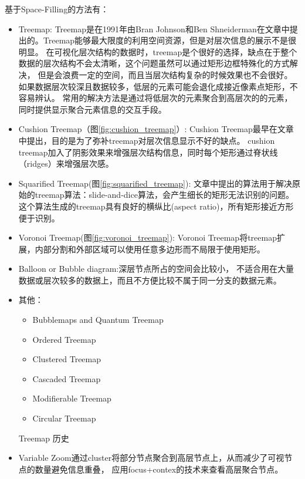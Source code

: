 \documentclass{article}
\begin{document}
基于Space-Filling的方法有：
\begin{itemize}
	\item Treemap:
		Treemap\cite{Johnson1991}是在1991年由Bran Johnson和Ben Shneiderman在文章中提出的。Treemap能够最大限度的利用空间资源，但是对层次信息的展示不是很明显。
		在可视化层次结构的数据时，treemap是个很好的选择，缺点在于整个数据的层次结构不会太清晰，这个问题虽然可以通过矩形边框特殊化的方式解决，
		但是会浪费一定的空间，而且当层次结构复杂的时候效果也不会很好。如果数据层次较深且数据较多，低层的元素可能会退化成接近像素点矩形，不容易辨认。
		常用的解决方法是通过将低层次的元素聚合到高层次的的元素，同时提供显示聚合元素信息的交互手段。

	\item Cushion Treemap（图\ref{fig:cushion_treemap}）:
		Cushion Treemap最早在文章\cite{Wijk1999}中提出，目的是为了弥补treemap对层次信息显示不好的缺点。
		cushion treemap加入了阴影效果来增强层次结构信息，同时每个矩形通过脊状线（ridges）来增强层次感。

	\item Squarified Treemap(图\ref{fig:squarified_treemap}):
		文章\cite{Bruls99squarifiedtreemaps}中提出的算法用于解决原始的treemap算法：slide-and-dice算法，会产生细长的矩形无法识别的问题。
		这个算法生成的treemap具有良好的横纵比(aspect ratio)，所有矩形接近方形便于识别。

	\item Voronoi Treemap(图\ref{fig:voronoi_treemap}):
		Voronoi Treemap\cite{Balzer_voronoitreemaps}将treemap扩展，内部分割和外部区域可以使用任意多边形而不局限于使用矩形。

	\item Balloon\cite{boardman2000bubble} or Bubble diagram:深层节点所占的空间会比较小，
		不适合用在大量数据或层次较多的数据上，而且不方便比较不属于同一分支的数据元素。

	\item 其他：
		\begin{itemize}
			\item Bubblemaps and Quantum Treemap
			\item Ordered Treemap
			\item Clustered Treemap
			\item Cascaded Treemap
			\item Modifierable Treemap
			\item Circular Treemap
		\end{itemize}
		Treemap 历史\cite{treemaphistory}
	\item Variable Zoom\cite{schaffer1996navigating}通过cluster将部分节点聚合到高层节点上，从而减少了可视节点的数量避免信息重叠，
		应用focus+contex的技术来查看高层聚合节点。


\end{itemize}
\end{document}
